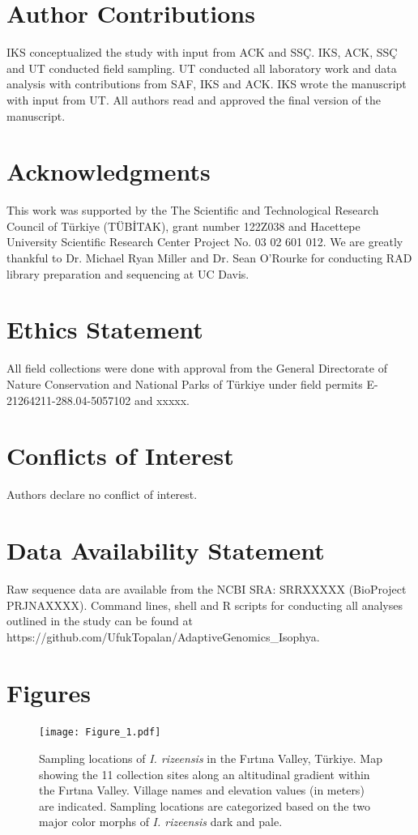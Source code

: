 \documentclass[9pt,a4paper,twoside]{rho-class/rho}
\begin{document}
\section{Author Contributions}
IKS conceptualized the study with input from ACK and SSÇ. IKS, ACK, SSÇ and UT conducted field sampling. UT conducted all laboratory work and data analysis with contributions from SAF, IKS and ACK. IKS wrote the manuscript with input from UT. All authors read and approved the final version of the manuscript.

\section{Acknowledgments}
This work was supported by the The Scientific and Technological Research Council of Türkiye (TÜBİTAK), grant number 122Z038 and Hacettepe University Scientific Research Center Project No. 03 02 601 012. We are greatly thankful to Dr. Michael Ryan Miller and Dr. Sean O'Rourke for conducting RAD library preparation and sequencing at UC Davis.  

\section{Ethics Statement}
All field collections were done with approval from the General Directorate of Nature Conservation and National Parks of Türkiye under field permits E-21264211-288.04-5057102 and xxxxx.

\section{Conflicts of Interest}
Authors declare no conflict of interest.

\section{Data Availability Statement}
Raw sequence data are available from the NCBI SRA: SRRXXXXX (BioProject PRJNAXXXX). Command lines, shell and R scripts for conducting all analyses outlined in the study can be found at https://github.com/UfukTopalan/AdaptiveGenomics\_Isophya.

\printbibliography
\clearpage\section{Figures}
\begin{figure}[h]
\centering
\texttt{[image: Figure\_1.pdf]}
\caption{Sampling locations of \textit{I. rizeensis} in the Fırtına Valley, Türkiye. Map showing the 11 collection sites along an altitudinal gradient within the Fırtına Valley. Village names and elevation values (in meters) are indicated. Sampling locations are categorized based on the two major color morphs of \textit{I. rizeensis} dark and pale.}
\label{Figure 1}
\end{figure}
\end{document}
